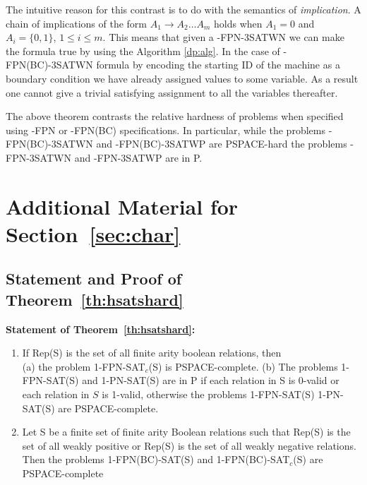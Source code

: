  








The intuitive reason for this contrast is to do with the semantics of 
{\em implication}. 
A chain of implications of the form $A_1 \rightarrow A_2 \ldots A_m$ 
holds when $A_1 = 0$ and $ A_i = \{0,1\}$, $ 1 \leq i \leq m$.  
This means that given a {-FPN-3SATWN} 
we can make the formula true by using the Algorithm \ref{dp:alg}.
In the case of {-FPN(BC)-3SATWN} formula by encoding the starting ID 
of the 
machine as a boundary condition we have already assigned values to some 
variable. As a result one cannot give a trivial satisfying assignment to
all the variables thereafter.


The above theorem contrasts the relative hardness of problems when specified
using {-FPN} or 
{-FPN(BC)} specifications. In particular, while the
problems {-FPN(BC)-3SATWN} and 
{-FPN(BC)-3SATWP} are {\sf PSPACE}-hard the problems
{-FPN-3SATWN} and {-FPN-3SATWP} are in {\sf P}.

\section{Additional Material for Section~\ref{sec:char}}
\label{sec:appC}

\subsection{Statement and Proof of Theorem~\ref{th:hsatshard}}

\noindent
\textbf{Statement of Theorem~\ref{th:hsatshard}:}~
\begin{enumerate}
\item
If Rep(S) is the set of all finite arity boolean relations, then\\
(a) the problem 1-FPN-SAT$_c$(S) is PSPACE-complete.
(b) The problems 1-FPN-SAT(S) and 1-PN-SAT(S) are  in P if each relation
in S is 0-valid or each relation in $S$ is 1-valid, otherwise
the problems 1-FPN-SAT(S) 1-PN-SAT(S) are  PSPACE-complete.
\item
Let S be a finite set of finite arity Boolean relations such that
Rep(S) is the set of all weakly positive or Rep(S) is the set
of all weakly negative relations. Then
the problems 1-FPN(BC)-SAT(S) and 1-FPN(BC)-SAT$_c$(S) are PSPACE-complete
\end{enumerate}

